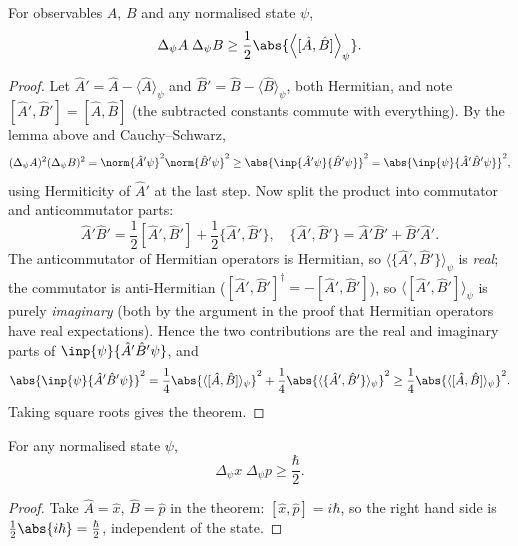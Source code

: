 \begin{theorem}
    For observables $A$, $B$ and any normalised state $\psi$,
    $$
    \Delta_\psi A \; \Delta_\psi B \geq \frac{1}{2} \abs{ \left\langle [\hat{A}, \hat{B}] \right\rangle_\psi }.
    $$
\end{theorem}
\begin{proof}
    Let $\hat{A}' = \hat{A} - \langle \hat{A}\rangle_\psi$ and $\hat{B}' = \hat{B} - \langle \hat{B} \rangle_\psi$, both Hermitian, and note $[\hat{A}', \hat{B}'] = [\hat{A}, \hat{B}]$ (the subtracted constants commute with everything). By the lemma above and Cauchy--Schwarz,
    $$
    (\Delta_\psi A)^2 (\Delta_\psi B)^2 = \norm{\hat{A}'\psi}^2 \norm{\hat{B}'\psi}^2 \geq \abs{\inp{\hat{A}'\psi}{\hat{B}'\psi}}^2 = \abs{\inp{\psi}{\hat{A}'\hat{B}'\psi}}^2,
    $$
    using Hermiticity of $\hat{A}'$ at the last step. Now split the product into commutator and anticommutator parts:
    $$
    \hat{A}'\hat{B}' = \frac{1}{2}[\hat{A}', \hat{B}'] + \frac{1}{2}\{\hat{A}', \hat{B}'\}, \quad \{\hat{A}', \hat{B}'\} = \hat{A}'\hat{B}' + \hat{B}'\hat{A}'.
    $$
    The anticommutator of Hermitian operators is Hermitian, so $\langle \{\hat{A}', \hat{B}'\}\rangle_\psi$ is \emph{real}; the commutator is anti-Hermitian ($[\hat{A}', \hat{B}']^\dagger = -[\hat{A}', \hat{B}']$), so $\langle [\hat{A}', \hat{B}'] \rangle_\psi$ is purely \emph{imaginary} (both by the argument in the proof that Hermitian operators have real expectations). Hence the two contributions are the real and imaginary parts of $\inp{\psi}{\hat{A}'\hat{B}'\psi}$, and
    $$
    \abs{\inp{\psi}{\hat{A}'\hat{B}'\psi}}^2 = \frac{1}{4}\abs{\langle [\hat{A}, \hat{B}] \rangle_\psi}^2 + \frac{1}{4}\abs{\langle \{\hat{A}', \hat{B}'\} \rangle_\psi}^2 \geq \frac{1}{4}\abs{\langle [\hat{A}, \hat{B}] \rangle_\psi}^2.
    $$
    Taking square roots gives the theorem.
\end{proof}

\begin{corollary}
    For any normalised state $\psi$,
    $$
    \Delta_\psi x \; \Delta_\psi p \geq \frac{\hbar}{2}.
    $$
\end{corollary}
\begin{proof}
    Take $\hat{A} = \hat{x}$, $\hat{B} = \hat{p}$ in the theorem: $[\hat{x}, \hat{p}] = i\hbar$, so the right hand side is $\frac{1}{2}\abs{i\hbar} = \frac{\hbar}{2}$, independent of the state.
\end{proof}

